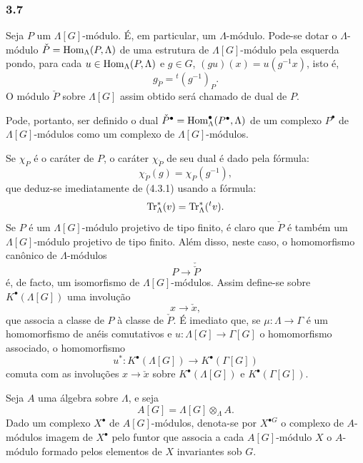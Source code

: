 \subsubsection*{3.7}

Seja $P$ um $\Lambda[G]$-módulo. É, em particular, um $\Lambda$-módulo. Pode-se dotar o $\Lambda$-módulo $\check P=\operatorname{Hom}_\Lambda(P,\Lambda)$ de uma estrutura de $\Lambda[G]$-módulo pela esquerda pondo, para cada $u\in\operatorname{Hom}_\Lambda(P,\Lambda)$ e $g\in G$, $(gu)(x)=u(g^{-1}x)$, isto é,
\[
g_{\check P}={}^{t}(g^{-1})_P.
\tag{3.7.1}
\]
O módulo $\check P$ sobre $\Lambda[G]$ assim obtido será chamado de dual de $P$.

Pode, portanto, ser definido o dual $\check P^\bullet=\operatorname{Hom}_\Lambda^\bullet(P^\bullet,\Lambda)$ de um complexo $P^\bullet$ de $\Lambda[G]$-módulos como um complexo de $\Lambda[G]$-módulos.

Se $\chi_P$ é o caráter de $P$, o caráter $\chi_{\check P}$ de seu dual é dado pela fórmula:
\[
\chi_{\check P}(g)=\chi_P(g^{-1}),
\tag{3.7.2}
\]
que deduz-se imediatamente de (4.3.1) usando a fórmula:
\[
\operatorname{Tr}_\Lambda^*(v)=\operatorname{Tr}_\Lambda^*({}^{t}v).
\]
Se $P$ é um $\Lambda[G]$-módulo projetivo de tipo finito, é claro que $\check P$ é também um $\Lambda[G]$-módulo projetivo de tipo finito. Além disso, neste caso, o homomorfismo canônico de $\Lambda$-módulos
\[
P\longrightarrow\check{\check P}
\]
é, de facto, um isomorfismo de $\Lambda[G]$-módulos. Assim define-se sobre $K^{\bullet}(\Lambda[G])$ uma involução
\[
x\longrightarrow \check x,
\]
que associa a classe de $P$ à classe de $\check P$. É imediato que, se $\mu:\Lambda\to\Gamma$ é um homomorfismo de anéis comutativos e $u:\Lambda[G]\to\Gamma[G]$ o homomorfismo associado, o homomorfismo
\[
u^*:K^{\bullet}(\Lambda[G])\longrightarrow K^{\bullet}(\Gamma[G])
\]
comuta com as involuções $x\longrightarrow \check x$ sobre $K^{\bullet}(\Lambda[G])$ e $K^{\bullet}(\Gamma[G])$.

Seja $A$ uma álgebra sobre $\Lambda$, e seja
\[
A[G]=\Lambda[G]\otimes_\Lambda A.
\]
Dado um complexo $X^\bullet$ de $A[G]$-módulos, denota-se por $X^{\bullet G}$ o complexo de $A$-módulos imagem de $X^\bullet$ pelo funtor que associa a cada $A[G]$-módulo $X$ o $A$-módulo formado pelos elementos de $X$ invariantes sob $G$.
